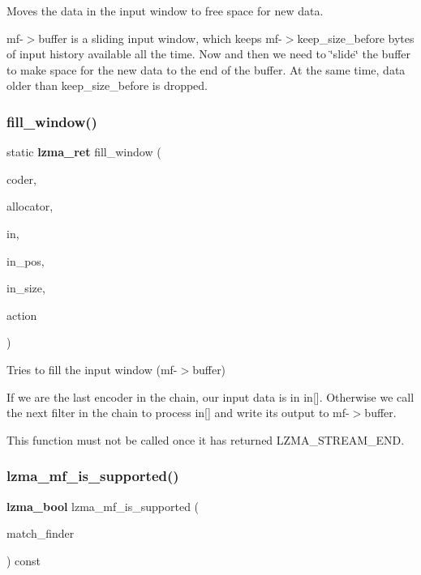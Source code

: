 Moves the data in the input window to free space for new data. 

mf-\/$>$buffer is a sliding input window, which keeps mf-\/$>$keep\+\_\+size\+\_\+before bytes of input history available all the time. Now and then we need to \char`\"{}slide\char`\"{} the buffer to make space for the new data to the end of the buffer. At the same time, data older than keep\+\_\+size\+\_\+before is dropped. \mbox{\label{lz__encoder_8c_af003fd0d53736a94b735eb04299ce08b}} 
\subsubsection{fill\+\_\+window()}
{\footnotesize\ttfamily static \textbf{ lzma\+\_\+ret} fill\+\_\+window (\begin{DoxyParamCaption}\item[{\textbf{ lzma\+\_\+coder} $\ast$}]{coder,  }\item[{const \textbf{ lzma\+\_\+allocator} $\ast$}]{allocator,  }\item[{const uint8\+\_\+t $\ast$}]{in,  }\item[{size\+\_\+t $\ast$}]{in\+\_\+pos,  }\item[{size\+\_\+t}]{in\+\_\+size,  }\item[{\textbf{ lzma\+\_\+action}}]{action }\end{DoxyParamCaption})\hspace{0.3cm}{\ttfamily [static]}}



Tries to fill the input window (mf-\/$>$buffer) 

If we are the last encoder in the chain, our input data is in in[]. Otherwise we call the next filter in the chain to process in[] and write its output to mf-\/$>$buffer.

This function must not be called once it has returned L\+Z\+M\+A\+\_\+\+S\+T\+R\+E\+A\+M\+\_\+\+E\+ND. \mbox{\label{lz__encoder_8c_a98a84efebf5e7ff1e8ddb821fc676d3f}} 
\subsubsection{lzma\+\_\+mf\+\_\+is\+\_\+supported()}
{\footnotesize\ttfamily \textbf{ lzma\+\_\+bool} lzma\+\_\+mf\+\_\+is\+\_\+supported (\begin{DoxyParamCaption}\item[{\textbf{ lzma\+\_\+match\+\_\+finder}}]{match\+\_\+finder }\end{DoxyParamCaption}) const}



